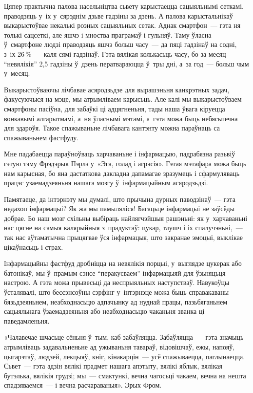 Цяпер практычна палова насельніцтва сьвету карыстаецца сацыяльнымі сеткамі, праводзяць у~іх у~сярэднім дзьве гадзіны за дзень. А палова карыстальнікаў выкарыстоўвае некалькі розных сацыяльных сетак. Аднак смартфон~--- гэта ня толькі сацсеткі, але яшчэ і мноства праграмаў і гульняў. Таму ўласна ў~смартфоне людзі праводзяць яшчэ больш часу~--- да пяці гадзінаў на содні, з~іх 26\,\%~--- каля сямі гадзінаў. Гэта вялікая колькасьць часу, бо за месяц ``невялікія'' 2,5 гадзіны ў~дзень ператвараюцца ў~тры дні, а~за год~--- больш чым у~месяц.

Выкарыстоўваючы лічбавае асяродзьдзе для вырашэньня канкрэтных задач, факусуючыся на мэце, мы атрымліваем карысьць. Але калі мы выкарыстоўваем смартфоны пасіўна, для забаўкі ці адцягненьня, тады наша ўвага кіруецца вонкавымі алгарытмамі, а~ня ўласнымі мэтамі, а~гэта можа быць небясьпечна для здароўя. Такое спажываньне лічбавага кантэнту можна параўнаць са спажываньнем фастфуду.

Мне падабаецца параўноўваць харчаваньне і інфармацыю, падрабязна разьвіў гэтую тэму Фрэдэрык Пэрлз у~«Эга, голад і агрэсія». Гэтая мэтафара можа быць нам карысная, бо яна дастаткова дакладна дапамагае зразумець і сфармуляваць працэс узаемадзеяньня нашага мозгу ў~інфармацыйным асяродзьдзі. 

Памятаеце, да інтэрнэту мы думалі, што прычына дурных паводзінаў~--- гэта недахоп інфармацыі? Як жа мы памыляліся! Багацьце інфармацыі не заўсёды добрае. Бо наш мозг схільны выбіраць найлягчэйшыя рашэньні: як у~харчаваньні нас цягне на самыя калярыйныя з~прадуктаў: цукар, тлушч і іх спалучэньні,~--- так нас аўтаматычна прыцягвае ўся інфармацыя, што закранае эмоцыі, выклікае цікаўнасьць і страх.

Інфармацыйны фастфуд дробніцца на невялікія порцыі, у~выглядзе цукерак або батонікаў, мы ў~прамым сэнсе ``перакусваем'' інфармацыяй для ўзьняцьця настрою. А гэта можа прывесьці да неспрыяльных наступстваў. Навукоўцы ўсталявалі, што бессэнсоўны сэрфінг у~інтэрнэце можа быць справакаваны бязьдзеяньнем, неабходнасьцю адпачынку ад нуднай працы, пазьбяганьнем сацыяльнага ўзаемадзеяньня або неабходнасьцю чаканьня званка ці паведамленьня.

«Чалавечае шчасьце сёньня ў~тым, каб забаўляцца. Забаўляцца~--- гэта значыць атрымліваць задавальненьне ад ужываньня тавараў, відовішчаў, ежы, напояў, цыгарэтаў, людзей, лекцыяў, кніг, кінакарцін~--- усё спажываецца, паглынаецца. Сьвет~--- гэта адзін вялікі прадмет нашага апэтыту, вялікі яблык, вялікая бутэлька, вялікія грудзі; мы~--- смактункі, вечна чагосьці чакаем, вечна на нешта спадзяваемся~--- і вечна расчараваныя». Эрых Фром. 

